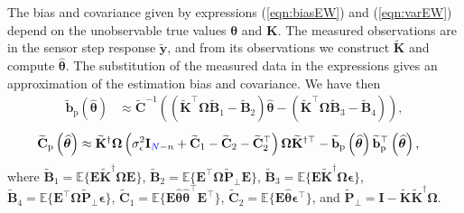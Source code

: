 The bias and covariance given by expressions (\ref{eqn:biasEW}) and (\ref{eqn:varEW}) depend on the unobservable true values $\bm{\theta}$ and $\mathbf{K}$.
The measured observations are in the sensor step response $\widetilde{\mathbf{y}}$, and from its observations we construct $\widetilde{\mathbf{K}}$ and compute $\widehat{\bm{\theta}}$.
The substitution of the measured data in the expressions gives an approximation of the estimation bias and covariance. 
We have then
\begin{equation} \begin{aligned} \widetilde{\mathbf{b}}_{\mathrm{p}} \left( \widehat{\bm{\theta}} \right) & \approx \widetilde{\mathbf{C}}^{-1} \left(  \left( \widetilde{\mathbf{K}}^\top \bm{\Omega} \widetilde{\mathbf{B}}_1 - \widetilde{\mathbf{B}}_2 \right) \widehat{\bm{\theta}} - \left( \widetilde{\mathbf{K}}^\top \bm{\Omega} \widetilde{\mathbf{B}}_3 - \widetilde{\mathbf{B}}_4 \right) \right), \end{aligned} \label{eqn:biasSTW} \end{equation}
  \begin{equation} \begin{aligned} \widetilde{\mathbf{C}}_{\mathrm{p}} \left( \widehat{\bm{\theta}} \right) & \approx \widetilde{\mathbf{K}}^\dagger \bm{\Omega} \left( \sigma_{\epsilon}^2 \mathbf{I}_{\color{blue}N\color{black}-n} + \widetilde{\mathbf{C}}_1 - \widetilde{\mathbf{C}}_2 - \widetilde{\mathbf{C}}_2^\top \right) \bm{\Omega} \widetilde{\mathbf{K}}^{\dagger \top} - \widetilde{\mathbf{b}}_{\mathrm{p}} \left( \widehat{\bm{\theta}} \right) \widetilde{\mathbf{b}}_{\mathrm{p}}^\top \left( \widehat{\bm{\theta}} \right), \end{aligned} \label{eqn:varSTW} \end{equation}
  where $\widetilde{\mathbf{B}}_1 = \mathbb{E} \Big\{ \mathbf{E} \widetilde{\mathbf{K}}^\dagger \bm{\Omega} \mathbf{E} \Big\}$, $\widetilde{\mathbf{B}}_2 = \mathbb{E} \Big\{ \mathbf{E}^\top \bm{\Omega} \widetilde{\mathbf{P}}_\perp \mathbf{E} \Big\}$, $\widetilde{\mathbf{B}}_3 = \mathbb{E} \Big\{ \mathbf{E} \widetilde{\mathbf{K}}^\dagger \bm{\Omega} \bm{\epsilon} \Big\}$, $\widetilde{\mathbf{B}}_4 = \mathbb{E} \Big\{ \mathbf{E}^\top \bm{\Omega} \widetilde{\mathbf{P}}_\perp \bm{\epsilon} \Big\}$, $\widetilde{\mathbf{C}}_1 = \mathbb{E} \Big\{ \mathbf{E} \widehat{\bm{\theta}} \widehat{\bm{\theta}}^\top \mathbf{E}^\top \Big\}$, $\widetilde{\mathbf{C}}_2 = \mathbb{E} \Big\{ \mathbf{E} \widehat{\bm{\theta}} \bm{\epsilon}^\top \Big\}$, and $\widetilde{\mathbf{P}}_\perp = \mathbf{I} - \widetilde{\mathbf{K}} \widetilde{\mathbf{K}}^\dagger \bm{\Omega}$. 

